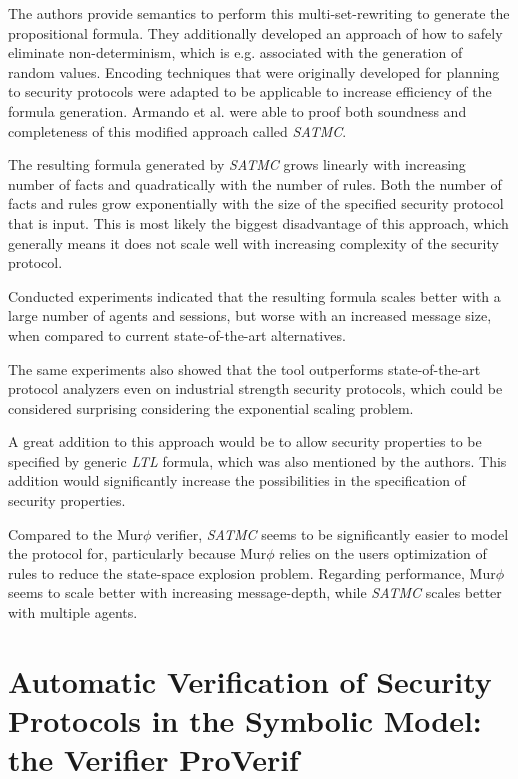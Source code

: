 \documentclass[a4paper,UKenglish]{lipics-v2018}
\def\murphi{Mur$\phi$ }
\begin{document}

The authors provide semantics to perform this multi-set-rewriting to generate the propositional formula. They additionally developed an approach of how to safely eliminate non-determinism, which is e.g. associated with the generation of random values.
Encoding techniques that were originally developed for planning to security protocols were adapted to be applicable to increase efficiency of the formula generation. Armando et al. were able to proof both soundness and completeness of this modified approach called \textit{SATMC}.
\cite{sat}

The resulting formula generated by \textit{SATMC} grows linearly with increasing number of facts and quadratically with the number of rules. Both the number of facts and rules grow exponentially with the size of the specified security protocol that is input. This is most likely the biggest disadvantage of this approach, which generally means it does not scale well with increasing complexity of the security protocol.
\cite{sat}

Conducted experiments indicated that the resulting formula scales better with a large number of agents and sessions, but worse with an increased message size, when compared to current state-of-the-art alternatives.
\cite{sat}


The same experiments also showed that the tool outperforms state-of-the-art protocol analyzers even on industrial strength security protocols, which could be considered surprising considering the exponential scaling problem.
\cite{sat}

A great addition to this approach would be to allow security properties to be specified by generic \textit{LTL} formula, which was also mentioned by the authors. This addition would significantly increase the possibilities in the specification of security properties.

Compared to the \murphi verifier, \textit{SATMC} seems to be significantly easier to model the protocol for, particularly because \murphi relies on the users optimization of rules to reduce the state-space explosion problem. Regarding performance, \murphi seems to scale better with increasing message-depth, while \textit{SATMC} scales better with multiple agents.




\section{Automatic Verification of Security Protocols in the Symbolic Model: the Verifier ProVerif}
\end{document}

